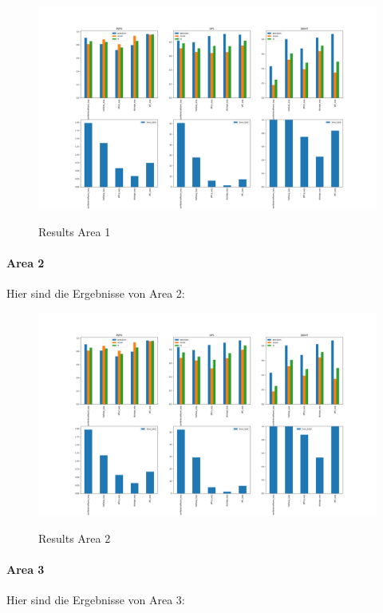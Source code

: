 \documentclass[main.tex]{subfiles}
\begin{document}
\begin{figure}
	\centering
	\includegraphics[width=15 cm]{images/area_1_ohne_kht.png}
	\label{fig:area1}
    \caption{Results Area 1}
\end{figure}

\paragraph*{Area 2}
Hier sind die Ergebnisse von Area 2:

\begin{figure}
	\centering
	\includegraphics[width=15 cm]{images/area_2_ohne_kht_ohne_audi.png}
	\label{fig:area2}
    \caption{Results Area 2}
\end{figure}

\paragraph*{Area 3}
Hier sind die Ergebnisse von Area 3:
\end{document}

